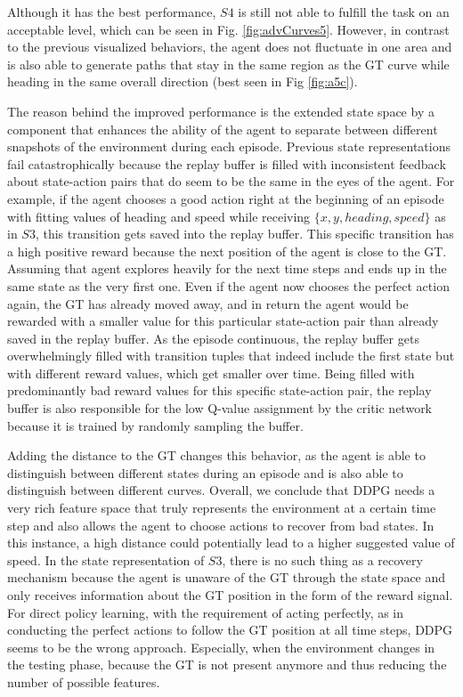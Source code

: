 Although it has the best performance, $S4$ is still not able to fulfill the task on an acceptable level, which can be seen in Fig. \ref{fig:advCurves5}. However, in contrast to the previous visualized behaviors, the agent does not fluctuate in one area and is also able to generate paths that stay in the same region as the GT curve while heading in the same overall direction (best seen in Fig \ref{fig:a5c}).
\par
The reason behind the improved performance is the extended state space by a component that enhances the ability of the agent to separate between different snapshots of the environment during each episode. Previous state representations fail catastrophically because the replay buffer is filled with inconsistent feedback about state-action pairs that do seem to be the same in the eyes of the agent. For example, if the agent chooses a good action right at the beginning of an episode with fitting values of heading and speed while receiving $\{x, y, heading, speed\}$ as in $S3$, this transition gets saved into the replay buffer. This specific transition has a high positive reward because the next position of the agent is close to the GT. Assuming that agent explores heavily for the next time steps and ends up in the same state as the very first one. Even if the agent now chooses the perfect action again, the GT has already moved away, and in return the agent would be rewarded with a smaller value for this particular state-action pair than already saved in the replay buffer. As the episode continuous, the replay buffer gets overwhelmingly filled with transition tuples that indeed include the first state but with different reward values, which get smaller over time. Being filled with predominantly bad reward values for this specific state-action pair, the replay buffer is also responsible for the low Q-value assignment by the critic network because it is trained by randomly sampling the buffer.
\par
Adding the distance to the GT changes this behavior, as the agent is able to distinguish between different states during an episode and is also able to distinguish between different curves. Overall, we conclude that DDPG needs a very rich feature space that truly represents the environment at a certain time step and also allows the agent to choose actions to recover from bad states. In this instance, a high distance could potentially lead to a higher suggested value of speed. In the state representation of $S3$, there is no such thing as a recovery mechanism because the agent is unaware of the GT through the state space and only receives information about the GT position in the form of the reward signal. For direct policy learning, with the requirement of acting perfectly, as in conducting the perfect actions to follow the GT position at all time steps, DDPG seems to be the wrong approach. Especially, when the environment changes in the testing phase, because the GT is not present anymore and thus reducing the number of possible features.
